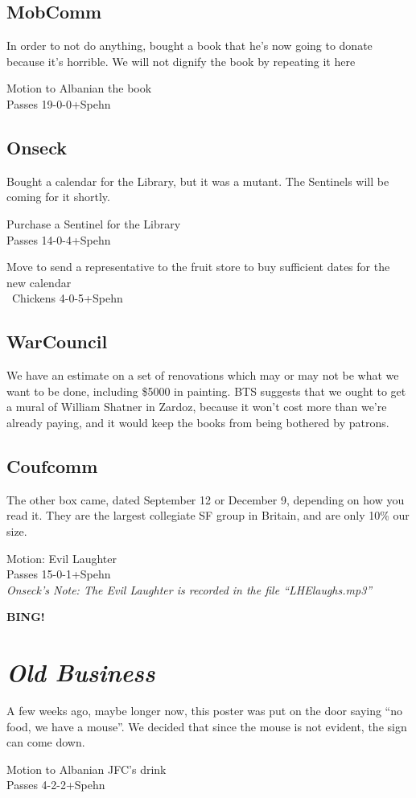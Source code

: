 \documentclass[10pt]{article}
\newcommand{\bing}{{\bf BING!} }
\newcommand{\goto}[1]{\bing \vskip 12pt \section*{{\em{#1}}}}
\begin{document}
\subsection*{MobComm}
In order to not do anything, bought a book that he's now going to
donate because it's horrible.
We will not dignify the book by repeating it here

Motion to Albanian the book\\
Passes 19-0-0+Spehn

\subsection*{Onseck}
Bought a calendar for the Library, but it was a mutant. The Sentinels
will be coming for it shortly.

Purchase a Sentinel for the Library\\
Passes 14-0-4+Spehn

Move to send a representative to the fruit store to buy sufficient
dates for the new calendar\\\
Chickens 4-0-5+Spehn

\subsection*{WarCouncil}
We have an estimate on a set of renovations which may or may not be
what we want to be done, including \$5000 in painting.  
BTS suggests that we ought to get a mural of William Shatner in
Zardoz, because it won't cost more than we're already paying, and it
would keep the books from being bothered by patrons.

\subsection*{Coufcomm}
The other box came, dated September 12 or December 9, depending on how
you read it. They are the largest collegiate SF group in Britain, and
are only 10\% our size.  

Motion: Evil Laughter\\
Passes 15-0-1+Spehn\\
\emph{Onseck's Note: The Evil Laughter is recorded in the file
  ``LHElaughs.mp3''}

\goto{Old Business}
A few weeks ago, maybe longer now, this poster was put on the door
saying ``no food, we have a mouse''.  We decided that since the mouse
is not evident, the sign can come down.

Motion to Albanian JFC's drink\\
Passes 4-2-2+Spehn
\end{document}
